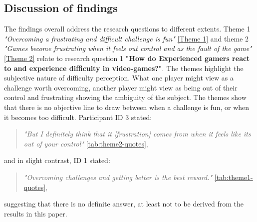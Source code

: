 \subsection{Discussion of findings}

The findings overall address the research questions to different extents. Theme 1 \textit{"Overcoming a frustrating and difficult challenge is fun"} \ref{Theme 1} and theme 2 \textit{"Games become frustrating when it feels out control and as the fault of the game"} \ref{Theme 2} relate to research question 1 \textbf{"How do Experienced gamers react to and experience difficulty in video-games?"}. The themes highlight the subjective nature of difficulty perception. What one player might view as a challenge worth overcoming, another player might view as being out of their control and frustrating showing the ambiguity of the subject. The themes show that there is no objective line to draw between when a challenge is fun, or when it becomes too difficult. Participant ID 3 stated: 
\begin{quote}
    \textit{"But I definitely think that it [frustration] comes from when it feels like its out of your control"} \ref{tab:theme2-quotes},
\end{quote}
and in slight contrast, ID 1 stated:
\begin{quote}
    \textit{"Overcoming challenges and getting better is the best reward."} \ref{tab:theme1-quotes},
\end{quote}
suggesting that there is no definite answer, at least not to be derived from the results in this paper. 

